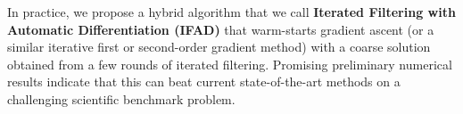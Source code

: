 \documentclass{article}
\begin{document}
In practice, we propose a hybrid algorithm that we call \textbf{Iterated Filtering with Automatic Differentiation (IFAD)} that warm-starts gradient ascent (or a similar iterative first or second-order gradient method) with a coarse solution obtained from a few rounds of iterated filtering. Promising preliminary numerical results indicate that this can beat current state-of-the-art methods on a challenging scientific benchmark problem.



\end{document}

